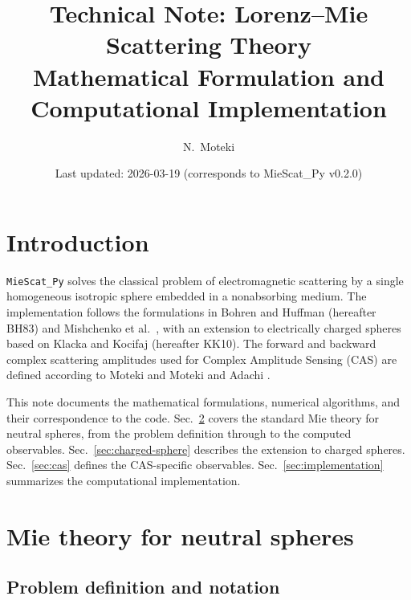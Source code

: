 \documentclass[a4paper,11pt]{article}
\title{Technical Note: Lorenz--Mie Scattering Theory\\[4pt]
\large Mathematical Formulation and Computational Implementation}
\author{N.\ Moteki}
\date{Last updated: 2026-03-19 (corresponds to MieScat\_Py v0.2.0)}
\begin{document}
\maketitle
\tableofcontents
\newpage

\section{Introduction}
\label{sec:introduction}

\texttt{MieScat\_Py} solves the classical problem of electromagnetic scattering
by a single homogeneous isotropic sphere embedded in a nonabsorbing medium.
The implementation follows the formulations in Bohren and Huffman
\cite{bohren1983} (hereafter BH83) and Mishchenko et al.\ \cite{mishchenko2002},
with an extension to electrically charged spheres based on Klacka and Kocifaj
\cite{klacka2010} (hereafter KK10).  The forward and backward complex
scattering amplitudes used for Complex Amplitude Sensing (CAS) are defined
according to Moteki \cite{moteki2021} and Moteki and Adachi \cite{moteki2024}.

This note documents the mathematical formulations, numerical algorithms, and
their correspondence to the code.  Sec.~\ref{sec:mie-theory} covers the
standard Mie theory for neutral spheres, from the problem definition through to
the computed observables.  Sec.~\ref{sec:charged-sphere} describes the
extension to charged spheres.  Sec.~\ref{sec:cas} defines the CAS-specific
observables.  Sec.~\ref{sec:implementation} summarizes the computational
implementation.


\section{Mie theory for neutral spheres}
\label{sec:mie-theory}

\subsection{Problem definition and notation}
\label{sec:problem-definition}
\end{document}
